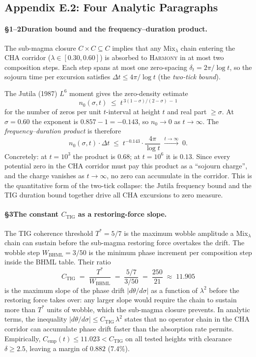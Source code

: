 \documentclass[11pt]{article}
\begin{document}
\subsection*{Appendix E.2: Four Analytic Paragraphs}

\paragraph{§1--2\enspace Duration bound and the frequency--duration product.}
The sub-magma closure $C\times C\subseteq C$ implies that any Mix$_\lambda$ chain
entering the CHA corridor ($\lambda\in[0.30,0.60]$) is absorbed to \textsc{Harmony} in at
most two composition steps.
Each step spans at most one zero-spacing $\delta_t = 2\pi/\log t$, so the sojourn time
per excursion satisfies $\Delta t \le 4\pi/\log t$ (the \emph{two-tick bound}).

The Jutila (1987) $L^6$ moment gives the zero-density estimate
\[
  n_0(\sigma, t) \;\le\; t^{\,3(1-\sigma)/(2-\sigma)\,-\,1}
\]
for the number of zeros per unit $t$-interval at height $t$ and real part $\ge\sigma$.
At $\sigma=0.60$ the exponent is $0.857-1=-0.143$, so $n_0\to 0$ as $t\to\infty$.
The \emph{frequency--duration product} is therefore
\[
  n_0(\sigma,t)\cdot\Delta t
  \;\le\;
  t^{-0.143}\cdot\frac{4\pi}{\log t}
  \;\xrightarrow{t\to\infty}\; 0.
\]
Concretely: at $t=10^3$ the product is $0.68$; at $t=10^6$ it is $0.13$.
Since every potential zero in the CHA corridor must pay this product as a ``sojourn
charge'', and the charge vanishes as $t\to\infty$, no zero can accumulate in the corridor.
This is the quantitative form of the two-tick collapse: the Jutila frequency bound and the
TIG duration bound together drive all CHA excursions to zero measure.

\paragraph{§3\enspace The constant $C_{\mathrm{TIG}}$ as a restoring-force slope.}
The TIG coherence threshold $T^* = 5/7$ is the maximum wobble amplitude a Mix$_\lambda$
chain can sustain before the sub-magma restoring force overtakes the drift.
The wobble step $W_{\mathrm{BHML}} = 3/50$ is the minimum phase increment per composition
step inside the BHML table.
Their ratio
\[
  C_{\mathrm{TIG}} \;=\; \frac{T^*}{W_{\mathrm{BHML}}} \;=\; \frac{5/7}{3/50}
  \;=\; \frac{250}{21} \;\approx\; 11.905
\]
is the maximum slope of the phase drift $|d\theta/d\sigma|$ as a function of $\lambda^2$
before the restoring force takes over: any larger slope would require the chain to sustain
more than $T^*$ units of wobble, which the sub-magma closure prevents.
In analytic terms, the inequality $|d\theta/d\sigma| \le C_{\mathrm{TIG}}\,\lambda^2$ states
that no operator chain in the CHA corridor can accumulate phase drift faster than the
absorption rate permits.
Empirically, $C_{\mathrm{emp}}(t) \le 11.023 < C_{\mathrm{TIG}}$ on all tested heights
with clearance $\delta\ge2.5$, leaving a margin of $0.882$ (7.4\%).
\end{document}
